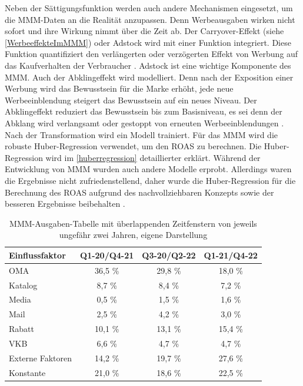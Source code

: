 Neben der Sättigungsfunktion werden auch andere Mechanismen eingesetzt, um die \ac{MMM}-Daten an die Realität anzupassen. Denn Werbeausgaben wirken nicht sofort und ihre Wirkung nimmt über die Zeit ab. Der Carryover-Effekt (siehe \autoref{WerbeeffekteImMMM}) oder Adstock wird mit einer Funktion integriert. Diese Funktion quantifiziert den verlängerten oder verzögerten Effekt von Werbung auf das Kaufverhalten der Verbraucher \cite{broadbent1979}. Adstock ist eine wichtige Komponente des \ac{MMM}. Auch der Abklingeffekt wird modelliert. Denn nach der Exposition einer Werbung wird das Bewusstsein für die Marke erhöht, jede neue Werbeeinblendung steigert das Bewusstsein auf ein neues Niveau. Der Abklingeffekt reduziert das Bewusstsein bis zum Basisniveau, es sei denn der Abklang wird verlangsamt oder gestoppt von erneuten Werbeeinblendungen \cite{Joseph2006Adstock}. Nach der Transformation wird ein Modell trainiert. Für das \ac{MMM} wird die robuste Huber-Regression verwendet, um den \ac{ROAS} zu berechnen. Die Huber-Regression wird im \autoref{huberregression} detaillierter erklärt. Während der Entwicklung von \ac{MMM} wurden auch andere Modelle erprobt. Allerdings waren die Ergebnisse nicht zufriedenstellend, daher wurde die Huber-Regression für die Berechnung des \ac{ROAS} aufgrund des nachvollziehbaren Konzepts sowie der besseren Ergebnisse beibehalten \cite{bonprixMMM}.
\begin{table}[H]
\centering
\renewcommand{\arraystretch}{1.3}
\setlength{\tabcolsep}{10pt}
\begin{tabular}{|l|c|c|c|}
\hline
\textbf{Einflussfaktor} & \textbf{Q1-20/Q4-21} & \textbf{Q3-20/Q2-22} & \textbf{Q1-21/Q4-22} \\ \hline
OMA                    & 36,5 \%               & 29,8 \%               & 18,0 \%               \\ \hline
Katalog                & 8,7 \%                & 8,4 \%                & 7,2 \%                \\ \hline
Media                  & 0,5 \%                & 1,5 \%                & 1,6 \%                \\ \hline
Mail                   & 2,5 \%                & 4,2 \%                & 3,0 \%                \\ \hline
Rabatt                 & 10,1 \%               & 13,1 \%               & 15,4 \%               \\ \hline
VKB                    & 6,6 \%                & 4,7 \%                & 4,7 \%                \\ \hline
Externe Faktoren       & 14,2 \%               & 19,7 \%               & 27,6 \%               \\ \hline
Konstante              & 21,0 \%               & 18,6 \%               & 22,5 \%               \\ \hline
\end{tabular}
\caption{\ac{MMM}-Ausgaben-Tabelle mit überlappenden Zeitfenstern von jeweils ungefähr zwei Jahren, eigene Darstellung}
\label{tab:mmmausgaben}
\end{table}
